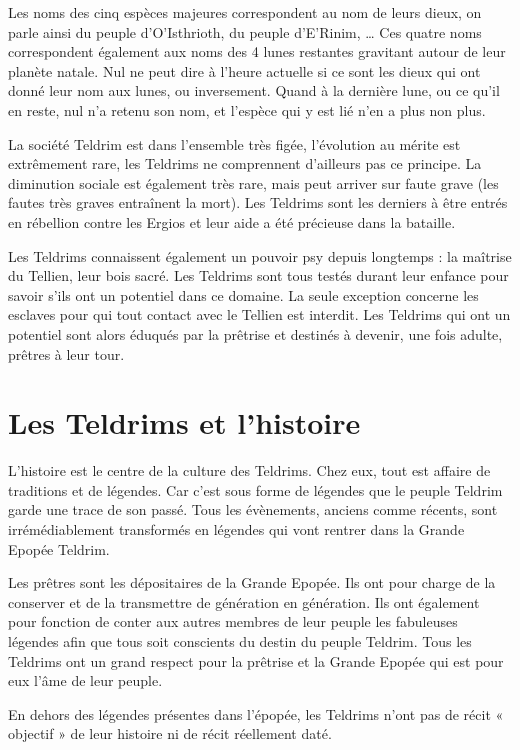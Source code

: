 \begin{multicols}{2}
Les noms des cinq espèces majeures correspondent au nom de leurs dieux, on parle ainsi du peuple d'O'Isthrioth, du peuple d'E'Rinim, … Ces quatre noms correspondent également aux noms des 4 lunes restantes gravitant autour de leur planète natale. Nul ne peut dire à l'heure actuelle si ce sont les dieux qui ont donné leur nom aux lunes, ou inversement. Quand à la dernière lune, ou ce qu'il en reste, nul n'a retenu son nom, et l'espèce qui y est lié n'en a plus non plus.

La société Teldrim est dans l'ensemble très figée, l'évolution au mérite est extrêmement rare, les Teldrims ne comprennent d'ailleurs pas ce principe. La diminution sociale est également très rare, mais peut arriver sur faute grave (les fautes très graves entraînent la mort). Les Teldrims sont les derniers à être entrés en rébellion contre les Ergios et leur aide a été précieuse dans la bataille.

Les Teldrims connaissent également un pouvoir psy depuis longtemps : la maîtrise du Tellien, leur bois sacré. Les Teldrims sont tous testés durant leur enfance pour savoir s'ils ont un potentiel dans ce domaine. La seule exception concerne les esclaves pour qui tout contact avec le Tellien est interdit. Les Teldrims qui ont un potentiel sont alors éduqués par la prêtrise et destinés à devenir, une fois adulte, prêtres à leur tour.

\section{Les Teldrims et l'histoire}

L'histoire est le centre de la culture des Teldrims. Chez eux, tout est affaire de traditions et de légendes. Car c'est sous forme de légendes que le peuple Teldrim garde une trace de son passé. Tous les évènements, anciens comme récents, sont irrémédiablement transformés en légendes qui vont rentrer dans la Grande Epopée Teldrim. 

Les prêtres sont les dépositaires de la Grande Epopée. Ils ont pour charge de la conserver et de la transmettre de génération en génération. Ils ont également pour fonction de conter aux autres membres de leur peuple les fabuleuses légendes afin que tous soit conscients du destin du peuple Teldrim. Tous les Teldrims ont un grand respect pour la prêtrise et la Grande Epopée qui est pour eux l'âme de leur peuple.

En dehors des légendes présentes dans l'épopée, les Teldrims n'ont pas de récit « objectif » de leur histoire ni de récit réellement daté. 


\end{multicols}
